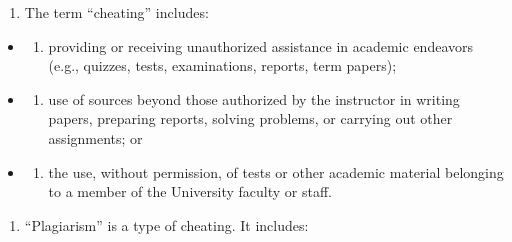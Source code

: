 \documentclass[
]{book}
\providecommand{\tightlist}{%
  \setlength{\itemsep}{0pt}\setlength{\parskip}{0pt}}
\begin{document}
\begin{enumerate}
\def\labelenumi{\arabic{enumi}.}
\tightlist
\item
  The term ``cheating'' includes:
\end{enumerate}

\begin{itemize}
\item
  \begin{enumerate}
  \def\labelenumi{(\alph{enumi})}
  \tightlist
  \item
    providing or receiving unauthorized assistance in academic endeavors (e.g., quizzes, tests, examinations, reports, term papers);
  \end{enumerate}
\item
  \begin{enumerate}
  \def\labelenumi{(\alph{enumi})}
  \setcounter{enumi}{1}
  \tightlist
  \item
    use of sources beyond those authorized by the instructor in writing papers, preparing reports, solving problems, or carrying out other assignments; or
  \end{enumerate}
\item
  \begin{enumerate}
  \def\labelenumi{(\alph{enumi})}
  \setcounter{enumi}{2}
  \tightlist
  \item
    the use, without permission, of tests or other academic material belonging to a member of the University faculty or staff.
  \end{enumerate}
\end{itemize}

\begin{enumerate}
\def\labelenumi{\arabic{enumi}.}
\setcounter{enumi}{1}
\tightlist
\item
  ``Plagiarism'' is a type of cheating. It includes:
\end{enumerate}
\end{document}
